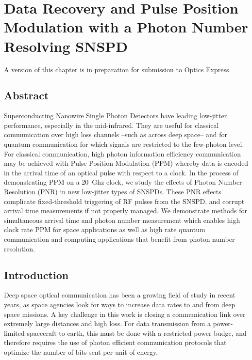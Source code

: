 \documentclass[11pt]{caltech_thesis} %
\begin{document}
\hypertarget{data-recovery-and-pulse-position-modulation-with-a-photon-number-resolving-snspd}{%
\chapter{Data Recovery and Pulse Position Modulation with a Photon Number Resolving SNSPD}\label{data-recovery-and-pulse-position-modulation-with-a-photon-number-resolving-snspd}}

A version of this chapter is in preparation for submission to Optics Express.

\hypertarget{abstract-2}{%
\section{Abstract}\label{abstract-2}}

Superconducting Nanowire Single Photon Detectors have leading low-jitter performance, especially in the mid-infrared. They are useful for classical communication over high loss channels --such as across deep space-- and for quantum communication for which signals are restricted to the few-photon level. For classical communication, high photon information efficiency communication may be achieved with Pulse Position Modulation (PPM) whereby data is encoded in the arrival time of an optical pulse with respect to a clock. In the process of demonstrating PPM on a 20~Ghz clock, we study the effects of Photon Number Resolution (PNR) in new low-jitter types of SNSPDs. These PNR effects complicate fixed-threshold triggering of RF pulses from the SNSPD, and corrupt arrival time measurements if not properly managed. We demonstrate methods for simultaneous arrival time and photon number measurement which enables high clock rate PPM for space applications as well as high rate quantum communication and computing applications that benefit from photon number resolution.

\hypertarget{introduction-3}{%
\section{Introduction}\label{introduction-3}}

Deep space optical communication has been a growing field of study in recent years, as space agencies look for ways to increase data rates to and from deep space missions. A key challenge in this work is closing a communication link over extremely large distances and high loss. For data transmission from a power-limited spacecraft to earth, this must be done with a restricted power budge, and therefore requires the use of photon efficient communication protocols that optimize the number of bits sent per unit of energy.
\end{document}
